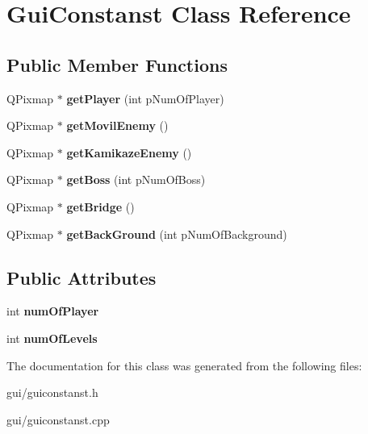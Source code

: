 \hypertarget{class_gui_constanst}{\section{Gui\-Constanst Class Reference}
\label{class_gui_constanst}
}
\subsection*{Public Member Functions}
\begin{DoxyCompactItemize}
\item 
\hypertarget{class_gui_constanst_af35eb5b02f4d373840be9b68b9239f25}{Q\-Pixmap $\ast$ {\bfseries get\-Player} (int p\-Num\-Of\-Player)}\label{class_gui_constanst_af35eb5b02f4d373840be9b68b9239f25}

\item 
\hypertarget{class_gui_constanst_a0161d18fc69f5c51c72084567b1e461e}{Q\-Pixmap $\ast$ {\bfseries get\-Movil\-Enemy} ()}\label{class_gui_constanst_a0161d18fc69f5c51c72084567b1e461e}

\item 
\hypertarget{class_gui_constanst_a6d6d4c99d0dc69d521f18cef478726fd}{Q\-Pixmap $\ast$ {\bfseries get\-Kamikaze\-Enemy} ()}\label{class_gui_constanst_a6d6d4c99d0dc69d521f18cef478726fd}

\item 
\hypertarget{class_gui_constanst_af4cfb5e43c5fa96febb9581b42f20b1f}{Q\-Pixmap $\ast$ {\bfseries get\-Boss} (int p\-Num\-Of\-Boss)}\label{class_gui_constanst_af4cfb5e43c5fa96febb9581b42f20b1f}

\item 
\hypertarget{class_gui_constanst_a7c838c62b5f08d461b2e3d68e513f77b}{Q\-Pixmap $\ast$ {\bfseries get\-Bridge} ()}\label{class_gui_constanst_a7c838c62b5f08d461b2e3d68e513f77b}

\item 
\hypertarget{class_gui_constanst_af46ca8e39f4a798237d581f435d26835}{Q\-Pixmap $\ast$ {\bfseries get\-Back\-Ground} (int p\-Num\-Of\-Background)}\label{class_gui_constanst_af46ca8e39f4a798237d581f435d26835}

\end{DoxyCompactItemize}
\subsection*{Public Attributes}
\begin{DoxyCompactItemize}
\item 
\hypertarget{class_gui_constanst_a98b9e1cb96d5c47abe38413f59c10835}{int {\bfseries num\-Of\-Player}}\label{class_gui_constanst_a98b9e1cb96d5c47abe38413f59c10835}

\item 
\hypertarget{class_gui_constanst_a21e10d5b961508c49dcd1dd76986eda8}{int {\bfseries num\-Of\-Levels}}\label{class_gui_constanst_a21e10d5b961508c49dcd1dd76986eda8}

\end{DoxyCompactItemize}


The documentation for this class was generated from the following files\-:\begin{DoxyCompactItemize}
\item 
gui/guiconstanst.\-h\item 
gui/guiconstanst.\-cpp\end{DoxyCompactItemize}
